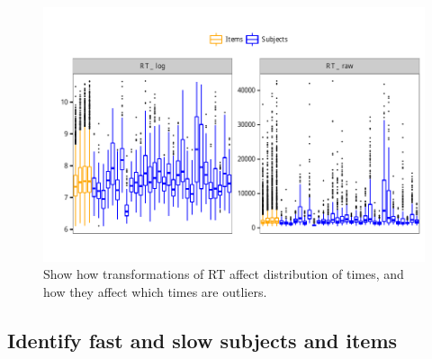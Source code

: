 \documentclass[a4paper,12pt,twoside]{article}\usepackage[]{graphicx}\usepackage[]{color}
\makeatletter
\def\maxwidth{ %
  \ifdim\Gin@nat@width>\linewidth
    \linewidth
  \else
    \Gin@nat@width
  \fi
}
\newenvironment{knitrout}{}{} %
\makeatother
\begin{document}
\begin{knitrout}\scriptsize
{}\color{fgcolor}\begin{figure}[hbtp]

{\centering \includegraphics[width=\maxwidth]{figure/graphics-plotBoxPlots-1} 

}

\caption[Show how transformations of RT affect distribution of times, and how they affect which times are outliers]{Show how transformations of RT affect distribution of times, and how they affect which times are outliers.}\label{fig:plotBoxPlots}
\end{figure}


\end{knitrout}

\clearpage
\subsection{Identify fast and slow subjects and items}
\end{document}
